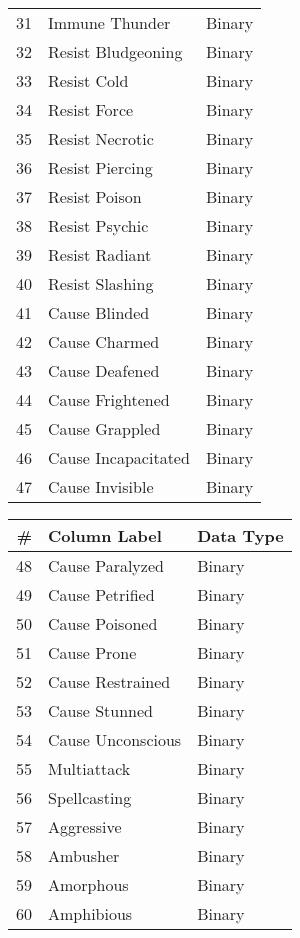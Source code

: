 \documentclass[12pt]{diazessay}
\begin{document}
\begin{table}[!htbp]
\begin{scriptsize}
\begin{minipage}[b]{0.45\linewidth}
\begin{longtable}[]{@{}rll@{}}
	31 & Immune Thunder & Binary \\
	32 & Resist Bludgeoning & Binary \\
	33 & Resist Cold & Binary \\
	34 & Resist Force & Binary \\
	35 & Resist Necrotic & Binary \\
	36 & Resist Piercing & Binary \\
	37 & Resist Poison & Binary \\
	38 & Resist Psychic & Binary \\
	39 & Resist Radiant & Binary \\
	40 & Resist Slashing & Binary \\
	41 & Cause Blinded & Binary \\
	42 & Cause Charmed & Binary \\
	43 & Cause Deafened & Binary \\
	44 & Cause Frightened & Binary \\
	45 & Cause Grappled & Binary \\
	46 & Cause Incapacitated & Binary \\
	47 & Cause Invisible & Binary \\
	\bottomrule
\end{longtable}
\end{minipage}
\hspace{0.5cm}
\begin{minipage}[b]{0.45\linewidth}\centering
\begin{longtable}{@{}rll@{}}
	\toprule
	\# & Column Label & Data Type \\
	\midrule
	\endhead
	48 & Cause Paralyzed & Binary \\
	49 & Cause Petrified & Binary \\
	50 & Cause Poisoned & Binary \\
	51 & Cause Prone & Binary \\
	52 & Cause Restrained & Binary \\
	53 & Cause Stunned & Binary \\
	54 & Cause Unconscious & Binary \\
	55 & Multiattack & Binary \\
	56 & Spellcasting & Binary \\
	57 & Aggressive & Binary \\
	58 & Ambusher & Binary \\
	59 & Amorphous & Binary \\
	60 & Amphibious & Binary \\

\end{longtable}
\end{minipage}
\end{scriptsize}
\end{table}
\end{document}
